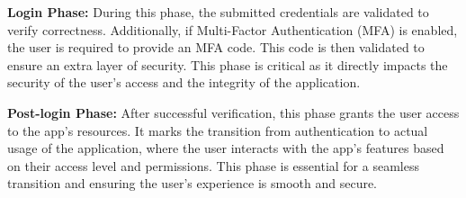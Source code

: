 \textbf{Login Phase:} During this phase, the submitted credentials are validated to verify correctness. Additionally, if Multi-Factor Authentication (MFA) is enabled, the user is required to provide an MFA code. This code is then validated to ensure an extra layer of security. This phase is critical as it directly impacts the security of the user's access and the integrity of the application.

\textbf{Post-login Phase:} After successful verification, this phase grants the user access to the app's resources. It marks the transition from authentication to actual usage of the application, where the user interacts with the app's features based on their access level and permissions. This phase is essential for a seamless transition and ensuring the user's experience is smooth and secure.

